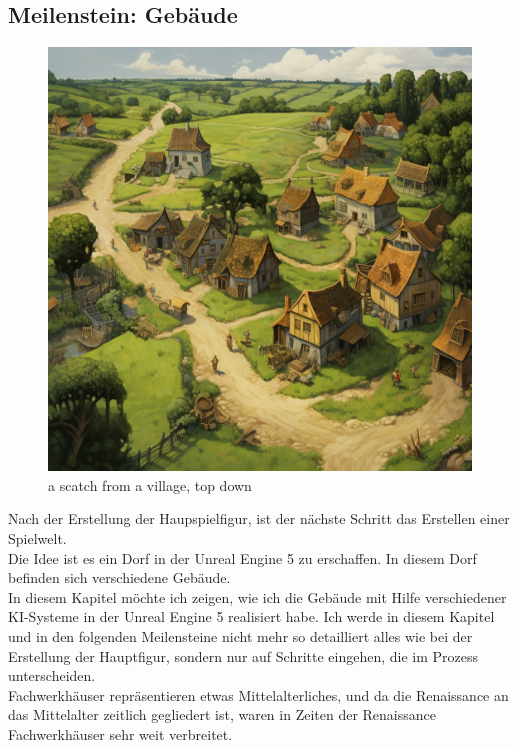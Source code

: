 \documentclass[12pt,a4paper,bibliography=totocnumbered,listof=totocnumbered]{scrartcl}
\begin{document}
\subsection {Meilenstein: Gebäude}
\begin{figure}[h]
	\centering
	\includegraphics[scale=0.2]{BilderFuerBA/MeilensteinGebaude/a_scatch_from_a_village_top_down.png}
	\caption{a scatch from a village, top down}
	\label{fig:Midjourney-Conceptart-Dorf}
\end{figure}
Nach der Erstellung der Haupspielfigur, ist der nächste Schritt das Erstellen einer Spielwelt.
\\
Die Idee ist es ein Dorf in der Unreal Engine 5 zu erschaffen. In diesem Dorf befinden sich verschiedene Gebäude.
\\
In diesem Kapitel möchte ich zeigen, wie ich die Gebäude mit Hilfe verschiedener KI-Systeme in der Unreal Engine 5 realisiert habe. Ich werde in diesem Kapitel und in den folgenden Meilensteine nicht mehr so detailliert alles wie bei der Erstellung der Hauptfigur, sondern nur auf Schritte eingehen, die im Prozess unterscheiden.
\\
Fachwerkhäuser repräsentieren etwas Mittelalterliches, und da die Renaissance an das Mittelalter zeitlich gegliedert ist, waren in Zeiten der Renaissance Fachwerkhäuser sehr weit verbreitet.
\\
\end{document}
